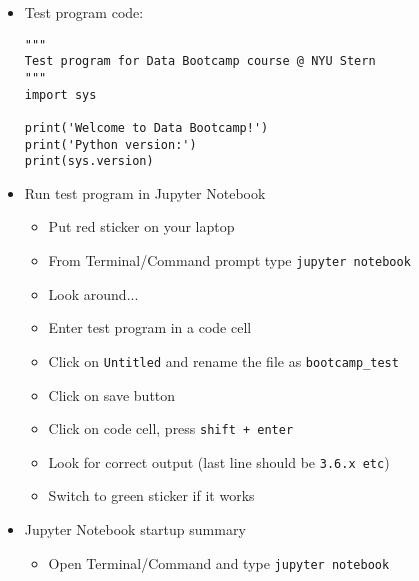 \begin{itemize}
\item Test program code:

\vspace{-0.1in}
\begin{verbatim}
"""
Test program for Data Bootcamp course @ NYU Stern
"""
import sys

print('Welcome to Data Bootcamp!')
print('Python version:')
print(sys.version)
\end{verbatim}

\item Run test program in Jupyter Notebook
\begin{itemize}
\item Put red sticker on your laptop
\item From Terminal/Command prompt type \verb|jupyter notebook|
\item Look around...
\item Enter test program in a code cell
\item Click on \verb|Untitled| and rename the file as \verb|bootcamp_test|
\item Click on save button
\item Click on code cell, press \verb|shift + enter|
\item Look for correct output (last line should be {\tt 3.6.x etc})
\item Switch to green sticker if it works
\end{itemize}


\item Jupyter Notebook startup summary
\begin{itemize}
\item Open Terminal/Command and type \verb|jupyter notebook|
\end{itemize}
\end{itemize}


